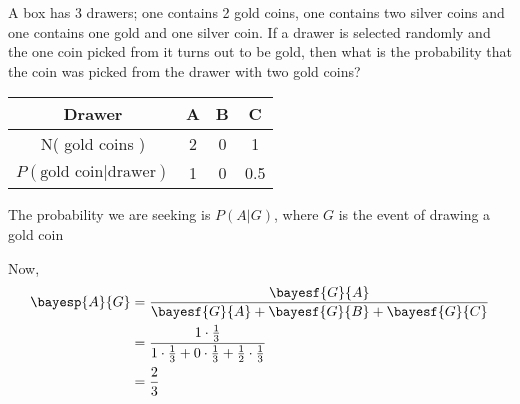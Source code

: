 

\question[2] A box has 3 drawers; one contains 2 gold coins, one contains two silver coins
and one contains one gold and one silver coin. If a drawer is selected randomly 
and the one coin picked from it turns out to be gold, then what is the probability
that the coin was picked from the drawer with two gold coins? 


\ifprintanswers
    \begin{tabular}{cccc}
       \toprule
       Drawer & A & B & C \\
       \midrule
       N( gold coins ) & 2 & 0 & 1 \\
       $P(\text{gold coin} \vert \text{drawer})$ & 1 & 0 & 0.5 \\
       \bottomrule
    \end{tabular}
\fi 

\begin{solution}[\halfpage]
    The probability we are seeking is $P(A \vert G)$, where $G$ is the event of drawing
    a gold coin
    
    Now, 
    \begin{align}
       \bayesp{A}{G} &= \dfrac{\bayesf{G}{A}}{\bayesf{G}{A} + \bayesf{G}{B} + \bayesf{G}{C}} \\
          &= \dfrac{1\cdot\frac{1}{3}}{1\cdot\frac{1}{3} + 0\cdot\frac{1}{3} 
          + \frac{1}{2}\cdot\frac{1}{3}} \\
          &= \dfrac{2}{3}
    \end{align}
\end{solution}
